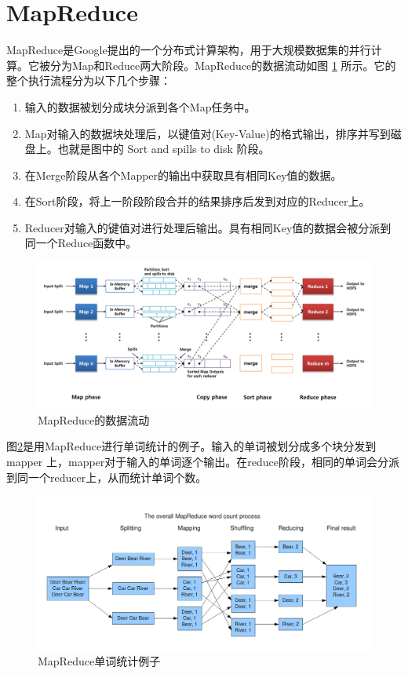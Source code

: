 \section{MapReduce}

MapReduce是Google提出的一个分布式计算架构，用于大规模数据集的并行计算。它被分为Map和Reduce两大阶段。MapReduce的数据流动如图 \ref{mr_data_flow} 所示。它的整个执行流程分为以下几个步骤：

\begin{enumerate}
\item 输入的数据被划分成块分派到各个Map任务中。
\item Map对输入的数据块处理后，以键值对(Key-Value)的格式输出，排序并写到磁盘上。也就是图中的 Sort and spills to disk 阶段。
\item 在Merge阶段从各个Mapper的输出中获取具有相同Key值的数据。
\item 在Sort阶段，将上一阶段阶段合并的结果排序后发到对应的Reducer上。
\item Reducer对输入的键值对进行处理后输出。具有相同Key值的数据会被分派到同一个Reduce函数中。
\end{enumerate}

\begin{figure}[h]
\centering\includegraphics[width=6in]{picture/ch_preliminary/mr_data_flow} 
\caption{MapReduce的数据流动}\label{mr_data_flow} 
\end{figure} 

图\ref{mr_word_count}是用MapReduce进行单词统计的例子。输入的单词被划分成多个块分发到 mapper 上，mapper对于输入的单词逐个输出。在reduce阶段，相同的单词会分派到同一个reducer上，从而统计单词个数。

\begin{figure}[!ht]
\centering\includegraphics[width=6in]{picture/ch_preliminary/mr_word_count} 
\caption{MapReduce单词统计例子}\label{mr_word_count} 
\end{figure} 

